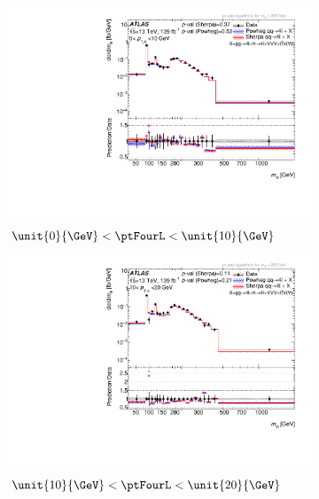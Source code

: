 \begin{figure}[htb!]
    \begin{subfigure}{.49\textwidth}\centering
      \includegraphics[width=.99\linewidth]{Figures/m4l/UnfoldedResults/linlog_Unfolded_Data_m4l_pt4l0-10.pdf}\caption{$\unit{0}{\GeV} <  \ptFourL  < \unit{10}{\GeV}$}\label{fig:sub-first}
    \end{subfigure}
    \begin{subfigure}{.49\textwidth}\centering
      \includegraphics[width=.99\linewidth]{Figures/m4l/UnfoldedResults/linlog_Unfolded_Data_m4l_pt4l10-20.pdf} \caption{$\unit{10}{\GeV} <  \ptFourL  < \unit{20}{\GeV}$}\label{fig:sub-second}
    \end{subfigure}
    \begin{subfigure}{.49\textwidth}\centering

\end{subfigure}
\end{figure}
